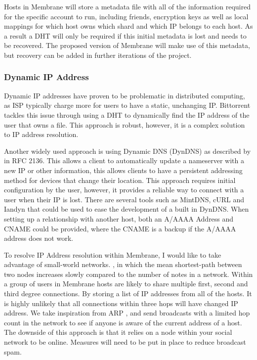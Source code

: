 \documentclass[a4paper,11pt, twocolumn]{report}
\begin{document}
Hosts in Membrane will store a metadata file with all of the information required for the specific account to run, including friends, encryption keys as well as local mappings for which host owns which shard and which IP belongs to each host. As a result a DHT will only be required if this initial metadata is lost and needs to be recovered. The proposed version of Membrane will make use of this metadata, but recovery can be added in further iterations of the project.

\subsubsection{Dynamic IP Address}

Dynamic IP addresses have proven to be problematic in distributed computing, as ISP typically charge more for users to have a static, unchanging IP. Bittorrent tackles this issue through using a DHT to dynamically find the IP address of the user that owns a file. This approach is robust, however, it is a complex solution to IP address resolution.

Another widely used approach is using Dynamic DNS (DynDNS) as described by \cite{bound1997dynamic} in RFC 2136. This allows a client to automatically update a nameserver with a new IP or other information, this allows clients to have a persistent addressing method for devices that change their location. This approach requires initial configuration by the user, however, it provides a reliable way to connect with a user when their IP is lost. There are several tools such as MintDNS, cURL and Iandyn that could be used to ease the development of a built in DynDNS. When setting up a relationship with another host, both an A/AAAA Address and CNAME could be provided, where the CNAME is a backup if the A/AAAA address does not work.

To resolve IP Address resolution within Membrane, I would like to take advantage of small-world networks. \citep{porter2012small}, in which the mean shortest-path between two nodes increases slowly compared to the number of notes in a network. Within a group of users in Membrane hosts are likely to share multiple first, second and third degree connections. By storing a list of IP addresses from all of the hosts. It is highly unlikely that all connections within three hops will have changed IP address. We take inspiration from ARP \citep{plummer1982ethernet}, and send broadcasts with a limited hop count in the network to see if anyone is aware of the current address of a host. The downside of this approach is that it relies on a node within your social network to be online. Measures will need to be put in place to reduce broadcast spam.
\end{document}
